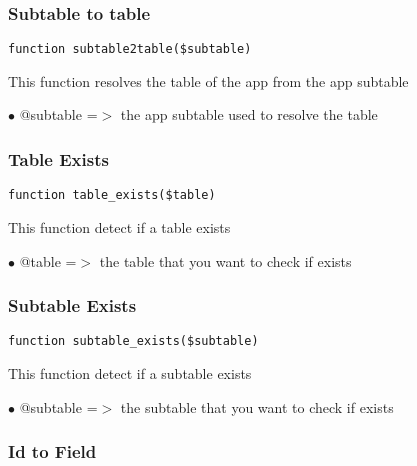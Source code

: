 \documentclass[a4paper]{article}
\begin{document}
\hypertarget{toc36}{}
\subsubsection{Subtable to table}

\begin{lstlisting}
function subtable2table($subtable)
\end{lstlisting}

This function resolves the table of the app from the app subtable

\begin{compactitem}
\item[\color{myblue}$\bullet$] @subtable =$>$ the app subtable used to resolve the table
\end{compactitem}

\hypertarget{toc37}{}
\subsubsection{Table Exists}

\begin{lstlisting}
function table_exists($table)
\end{lstlisting}

This function detect if a table exists

\begin{compactitem}
\item[\color{myblue}$\bullet$] @table =$>$ the table that you want to check if exists
\end{compactitem}

\hypertarget{toc38}{}
\subsubsection{Subtable Exists}

\begin{lstlisting}
function subtable_exists($subtable)
\end{lstlisting}

This function detect if a subtable exists

\begin{compactitem}
\item[\color{myblue}$\bullet$] @subtable =$>$ the subtable that you want to check if exists
\end{compactitem}

\hypertarget{toc39}{}
\subsubsection{Id to Field}
\end{document}

